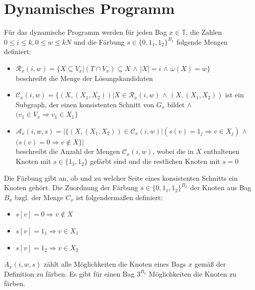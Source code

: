 \section{Dynamisches Programm}
\label{sec:dynP}

Für das dynamische Programm werden für jeden Bag $x \in \mathbb{T}$, die Zahlen $0 \leq i \leq k,0 \leq w \leq kN$ und die Färbung $s \in \{0,1_1,1_2 \}^{B_x}$ folgende Mengen definiert:
\begin{itemize}
\item $\mathcal{R}_x(i,w)=\{X \subseteq V_x | (T \cap V_x) \subseteq X$ $\wedge$ $|X| = i$ $\wedge$ $\omega (X) = w \}$ \\
beschreibt die Menge der Lösungskandidaten
\item $\mathcal{C}_x (i,w) =\{ (X,(X_1,X_2)) | X \in \mathcal{R}_x(i,w)$ $\wedge$ $(X,(X_1,X_2))$ ist ein Subgraph, der einen konsistenten Schnitt von $G_x$ bildet $\wedge$ $(v_1 \in V_x \Rightarrow v_1 \in X_1 \} $
\item $\mathcal{A}_x(i,w,s)=| \{ (X,(X_1,X_2)) \in \mathcal{C}_x(i,w) | (s(v) = 1_j \Rightarrow v \in X_j)$ $\wedge$ $(s(v)=0 \Rightarrow v \notin X \} |$ \\
beschreibt die Anzahl der Mengen $\mathcal{C}_x(i,w)$, wobei die in $X$ enthaltenen Knoten mit $s \in \{1_1,1_2\}$ gefärbt sind und die restlichen Knoten mit $s=0$ 
\end{itemize}
Die Färbung gibt an, ob und zu welcher Seite eines konsistenten Schnitts ein Knoten gehört.
Die Zuordnung der Färbung $s \in \{0,1_1,1_2 \}^{B_x}$  der Knoten aus Bag $B_x$ bzgl. der Menge $C_x$ ist folgendermaßen definiert:
\begin{itemize}
\item $s[v] = 0 \Rightarrow v \notin X$
\item $s[v] = 1_1 \Rightarrow v \in X_1$ 
\item $s[v] = 1_2 \Rightarrow v \in X_2$ 
\end{itemize}
$A_x(i,w,s)$ zählt alle Möglichkeiten die Knoten eines Bags $x$ gemäß der Definition zu färben. Es gibt für einen Bag $3^{B_x}$ Möglichkeiten die Knoten zu färben.

